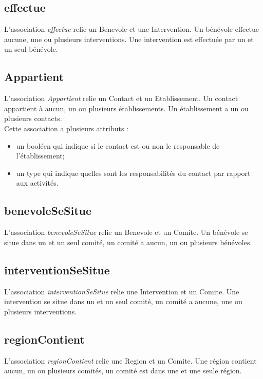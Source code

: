 \documentclass[asi, sansVersion]{picInsa}
\begin{document}
\subsection*{effectue} 

L'association \textit{effectue} relie un Benevole et une Intervention. Un bénévole effectue aucune, une ou plusieurs interventions. Une intervention est effectuée par un et un seul bénévole. 

\subsection*{Appartient}

L'association \textit{Appartient} relie un Contact et un Etablissement. Un contact appartient à aucun, un ou plusieurs établissements. Un établissement a un ou plusieurs contacts.\\
Cette association a plusieurs attributs :
\begin{itemize}
\item un booléen qui indique si le contact est ou non le responsable de l'établissement; 
\item un type qui indique quelles sont les responsabilités du contact par rapport aux activités.
\end{itemize}


\subsection*{benevoleSeSitue}

L'association \textit{benevoleSeSitue} relie un Benevole et un Comite. Un bénévole se situe dans un et un seul comité, un comité a aucun, un ou plusieurs bénévoles.

\subsection*{interventionSeSitue}

L'association \textit{interventionSeSitue} relie une Intervention et un Comite. Une intervention se situe dans un et un seul comité, un comité a aucune, une ou plusieurs interventions.

\subsection*{regionContient}

L'association \textit{regionContient} relie une Region et un Comite. Une région contient aucun, un ou plusieurs comités, un comité est dans une et une seule région.
\end{document}
